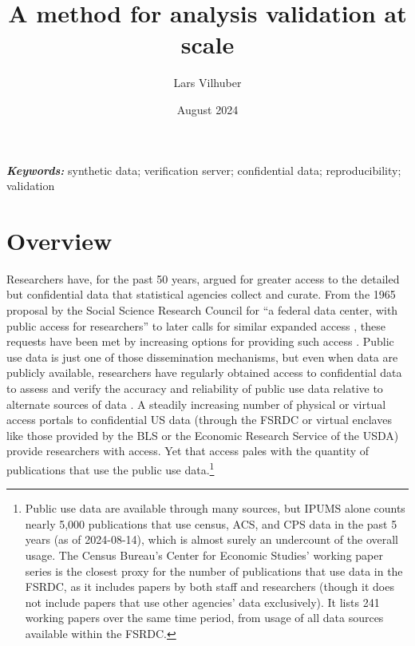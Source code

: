 \documentclass[12pt]{article}
\title{A method for analysis validation at scale}
\author{Lars Vilhuber}
\date{August 2024}
\begin{document}
\maketitle

%

\vspace*{0.15in}
\hspace{10pt}
  \small	
  \textbf{\textit{Keywords: }} {synthetic data; verification server; confidential data; reproducibility; validation}
  
\section{Overview}
\label{sec:overview}

Researchers have, for the past 50 years, argued for greater access to the detailed but confidential data that statistical agencies collect and curate. From the 1965 proposal by the Social Science Research
Council for ``a federal data center, with public access for researchers'' \citep[pg. 219]{anderson_american_2015} to later calls for similar expanded access \citep[e.g.][]{card_expanding_2010}, these requests have been met by increasing options for providing such access \citep{united_nations_managing_2007,schouten_remote_2003,weinberg_access_2007,cole_handbook_2021}. Public use data is just one of those dissemination mechanisms, but even when data are publicly available, researchers have regularly obtained access to confidential data to assess and verify the accuracy and reliability of public use data relative to alternate sources of data \citep[to cite just a few, ][]{larrimore_consistent_2008,armour_using_2016,alexander_inaccurate_2010,abraham_exploring_2013,abraham_reconciling_2020}. A steadily increasing number of physical or virtual access portals to confidential US data (through the \ac{FSRDC} or virtual enclaves like those provided by the \ac{BLS} or the Economic Research Service of the USDA) provide researchers with access. Yet that access pales with the quantity of publications that use the public use data.\footnote{Public use data are available through many sources, but \ac{IPUMS} alone counts nearly 5,000 publications that use census, \ac{ACS}, and \ac{CPS} data in the past 5 years (as of 2024-08-14), which is almost surely an undercount of the overall usage. The Census Bureau's Center for Economic Studies' working paper series is the closest proxy for the number of publications that use data in the \ac{FSRDC}, as it includes papers by both staff and researchers (though it does not include papers that use other agencies' data exclusively). It lists 241 working papers over the same time period, from usage of all data sources available within the \ac{FSRDC}.} 
\end{document}
